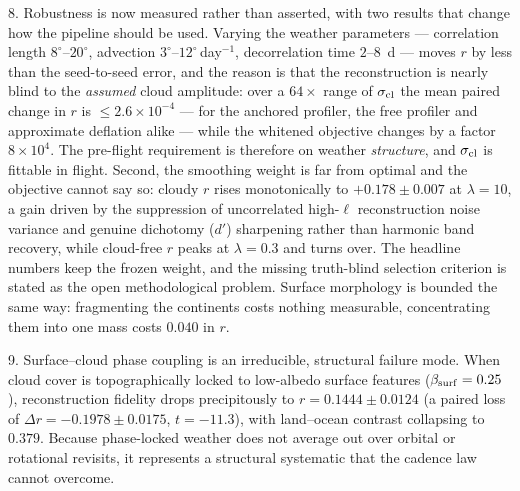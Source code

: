\documentclass[twocolumn,10pt]{article}
\begin{document}
8. Robustness is now measured rather than asserted, with two results that
change how the pipeline should be used. Varying the weather parameters ---
correlation length $8^\circ$--$20^\circ$, advection $3^\circ$--$12^\circ$\,day$^{-1}$,
decorrelation time $2$--$8$~d --- moves $r$ by less than the seed-to-seed error,
and the reason is that the reconstruction is nearly blind to the \emph{assumed}
cloud amplitude: over a $64\times$ range of $\sigma_{\rm cl}$ the mean paired change
in $r$ is $\le2.6\times10^{-4}$ --- for the anchored profiler, the free profiler and
approximate deflation alike --- while the whitened objective changes by a factor
$8\times10^{4}$. The pre-flight requirement is therefore on weather
\emph{structure}, and $\sigma_{\rm cl}$ is fittable in flight. Second, the
smoothing weight is far from optimal and the objective cannot say so: cloudy $r$
rises monotonically to $+0.178\pm0.007$ at $\lambda=10$, a gain driven by the
suppression of uncorrelated high-$\ell$ reconstruction noise variance and genuine
dichotomy ($d'$) sharpening rather than harmonic band recovery, while
cloud-free $r$ peaks at $\lambda=0.3$ and turns over. The headline numbers keep
the frozen weight, and the missing truth-blind selection criterion is stated as
the open methodological problem. Surface morphology is bounded the same way:
fragmenting the continents costs nothing measurable, concentrating them into one
mass costs $0.040$ in $r$.

9. Surface--cloud phase coupling is an irreducible, structural failure mode.
When cloud cover is topographically locked to low-albedo surface features
($\beta_{\rm surf}=0.25$), reconstruction fidelity drops precipitously to
$r=0.1444\pm0.0124$ (a paired loss of $\Delta r=-0.1978\pm0.0175$, $t=-11.3$),
with land--ocean contrast collapsing to $0.379$. Because phase-locked weather does
not average out over orbital or rotational revisits, it represents a structural
systematic that the cadence law cannot overcome.
\end{document}

